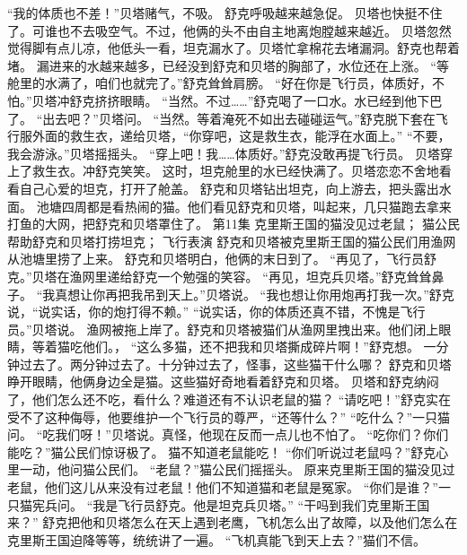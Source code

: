 \documentclass[a4paper,12pt,UTF8,twoside]{ctexbook}
\begin{document}
        “我的体质也不差！”贝塔赌气，不吸。 
        舒克呼吸越来越急促。 
        贝塔也快挺不住了。可谁也不去吸空气。不过，他俩的头不由自主地离炮膛越来越近。 
        贝塔忽然觉得脚有点儿凉，他低头一看，坦克漏水了。贝塔忙拿棉花去堵漏洞。舒克也帮着堵。 
        漏进来的水越来越多，已经没到舒克和贝塔的胸部了，水位还在上涨。 
        “等舱里的水满了，咱们也就完了。”舒克耸耸肩膀。 
        “好在你是飞行员，体质好，不怕。”贝塔冲舒克挤挤眼睛。 
        “当然。不过……”舒克喝了一口水。水已经到他下巴了。 
        “出去吧？”贝塔问。 
        “当然。等着淹死不如出去碰碰运气。”舒克脱下套在飞行服外面的救生衣，递给贝塔，“你穿吧，这是救生衣，能浮在水面上。” 
        “不要，我会游泳。”贝塔摇摇头。 
        “穿上吧！我……体质好。”舒克没敢再提飞行员。 
        贝塔穿上了救生衣。冲舒克笑笑。 
        这时，坦克舱里的水已经快满了。贝塔恋恋不舍地看看自己心爱的坦克，打开了舱盖。 
        舒克和贝塔钻出坦克，向上游去，把头露出水面。 
        池塘四周都是看热闹的猫。他们看见舒克和贝塔，叫起来，几只猫跑去拿来打鱼的大网，把舒克和贝塔罩住了。   第11集 
        克里斯王国的猫没见过老鼠； 
        猫公民帮助舒克和贝塔打捞坦克； 
        飞行表演   
        舒克和贝塔被克里斯王国的猫公民们用渔网从池塘里捞了上来。 
        舒克和贝塔明白，他俩的末日到了。 
        “再见了，飞行员舒克。”贝塔在渔网里递给舒克一个勉强的笑容。 
        “再见，坦克兵贝塔。”舒克耸耸鼻子。 
        “我真想让你再把我吊到天上。”贝塔说。 
        “我也想让你用炮再打我一次。”舒克说，“说实话，你的炮打得不赖。” 
        “说实话，你的体质还真不错，不愧是飞行员。”贝塔说。 
        渔网被拖上岸了。舒克和贝塔被猫们从渔网里拽出来。他们闭上眼睛，等着猫吃他们。， 
        “这么多猫，还不把我和贝塔撕成碎片啊！”舒克想。 
        一分钟过去了。两分钟过去了。十分钟过去了，怪事，这些猫干什么哪？ 
        舒克和贝塔睁开眼睛，他俩身边全是猫。这些猫好奇地看着舒克和贝塔。 
        贝塔和舒克纳闷了，他们怎么还不吃，看什么？难道还有不认识老鼠的猫？ 
        “请吃吧！”舒克实在受不了这种侮辱，他要维护一个飞行员的尊严，“还等什么？” 
        “吃什么？”一只猫问。 
        “吃我们呀！”贝塔说。真怪，他现在反而一点儿也不怕了。 
        “吃你们？你们能吃？”猫公民们惊讶极了。 
        猫不知道老鼠能吃！ 
        “你们听说过老鼠吗？”舒克心里一动，他问猫公民们。 
        “老鼠？”猫公民们摇摇头。 
        原来克里斯王国的猫没见过老鼠，他们这儿从来没有过老鼠！他们不知道猫和老鼠是冤家。 
        “你们是谁？”一只猫宪兵问。 
        “我是飞行员舒克。他是坦克兵贝塔。” 
        “干吗到我们克里斯王国来？” 
        舒克把他和贝塔怎么在天上遇到老鹰，飞机怎么出了故障，以及他们怎么在克里斯王国迫降等等，统统讲了一遍。 
        “飞机真能飞到天上去？”猫们不信。 
\end{document}
